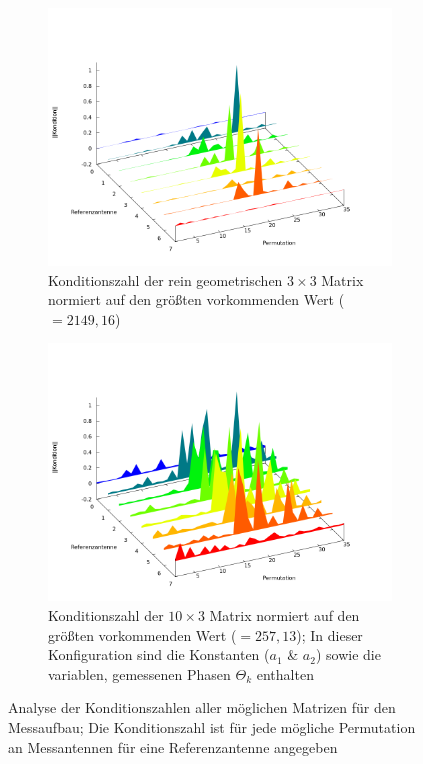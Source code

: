 \documentclass[a4paper,12pt,fleqn]{article}
\begin{document}
\begin{figure}
         \centering
         \begin{subfigure}[h]{0.5\textwidth}
                 \centering
                 \includegraphics[width=\textwidth]{common/img/fenceModell3x3.png}
                 \caption{Konditionszahl der rein geometrischen $3\times3$ Matrix normiert auf den größten vorkommenden Wert ($=2149,16                 $)}
                 \label{fig:AnalyzeOf3x3}
         \end{subfigure}
%         
         \begin{subfigure}[h]{0.5\textwidth}
                 \centering
                 \includegraphics[width=\textwidth]{common/img/fenceModell9x3.png}
                 \caption{Konditionszahl der $10\times3$ Matrix normiert auf den größten vorkommenden Wert ($=257,13$); In dieser Konfiguration sind die Konstanten ($a_1$ \& $a_2$) sowie die variablen, gemessenen Phasen $\Theta_k$ enthalten}
                 \label{fig:AnalyzeOf10x3}
         \end{subfigure}
%
         \caption{Analyse der Konditionszahlen aller möglichen Matrizen für den Messaufbau; Die Konditionszahl ist für jede mögliche Permutation an Messantennen für eine Referenzantenne angegeben}\label{fig:CondNumberAnalyze}
\end{figure}
\end{document}
